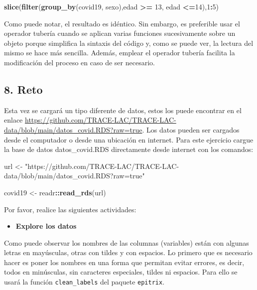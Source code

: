\documentclass[
]{article}
\newenvironment{Shaded}{\begin{snugshade}}{\end{snugshade}}
\newcommand{\DecValTok}[1]{\textcolor[rgb]{0.00,0.00,0.81}{#1}}
\newcommand{\FunctionTok}[1]{\textcolor[rgb]{0.13,0.29,0.53}{\textbf{#1}}}
\newcommand{\NormalTok}[1]{#1}
\newcommand{\OtherTok}[1]{\textcolor[rgb]{0.56,0.35,0.01}{#1}}
\newcommand{\SpecialCharTok}[1]{\textcolor[rgb]{0.81,0.36,0.00}{\textbf{#1}}}
\newcommand{\StringTok}[1]{\textcolor[rgb]{0.31,0.60,0.02}{#1}}
\providecommand{\tightlist}{%
  \setlength{\itemsep}{0pt}\setlength{\parskip}{0pt}}
\begin{document}
\begin{Shaded}
\begin{Highlighting}[]
\FunctionTok{slice}\NormalTok{(}\FunctionTok{filter}\NormalTok{(}\FunctionTok{group\_by}\NormalTok{(covid19, sexo),edad }\SpecialCharTok{\textgreater{}=} \DecValTok{13}\NormalTok{, edad }\SpecialCharTok{\textless{}=}\DecValTok{14}\NormalTok{),}\DecValTok{1}\SpecialCharTok{:}\DecValTok{5}\NormalTok{)}
\end{Highlighting}
\end{Shaded}

Como puede notar, el resultado es idéntico. Sin embargo, es preferible
usar el operador tubería cuando se aplican varias funciones
sucesivamente sobre un objeto porque simplifica la sintaxis del código
y, como se puede ver, la lectura del mismo se hace más sencilla. Además,
emplear el operador tubería facilita la modificación del proceso en caso
de ser necesario.

\subsection{8. Reto}\label{reto}

Esta vez se cargará un tipo diferente de datos, estos los puede
encontrar en el enlace
\url{https://github.com/TRACE-LAC/TRACE-LAC-data/blob/main/datos_covid.RDS?raw=true}.
Los datos pueden ser cargados desde el computador o desde una ubicación
en internet. Para este ejercicio cargue la base de datos
datos\_covid.RDS directamente desde internet con los comandos:

\begin{Shaded}
\begin{Highlighting}[]
\NormalTok{url }\OtherTok{\textless{}{-}} \StringTok{"https://github.com/TRACE{-}LAC/TRACE{-}LAC{-}data/blob/main/datos\_covid.RDS?raw=true"}

\NormalTok{covid19 }\OtherTok{\textless{}{-}}\NormalTok{ readr}\SpecialCharTok{::}\FunctionTok{read\_rds}\NormalTok{(url)}
\end{Highlighting}
\end{Shaded}

Por favor, realice las siguientes actividades:

\begin{itemize}
\tightlist
\item
  \textbf{Explore los datos}
\end{itemize}

Como puede observar los nombres de las columnas (variables) están con
algunas letras en mayúsculas, otras con tildes y con espacios. Lo
primero que es necesario hacer es poner los nombres en una forma que
permitan evitar errores, es decir, todos en minúsculas, sin caracteres
especiales, tildes ni espacios. Para ello se usará la función
\texttt{clean\_labels} del paquete \texttt{epitrix}.
\end{document}

